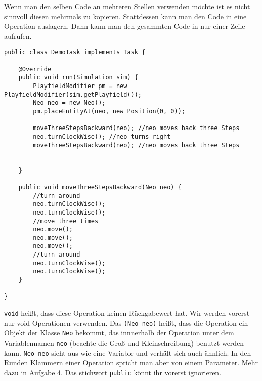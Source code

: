 \begin{Infobox}[Operation]
	Wenn man den selben Code an mehreren Stellen verwenden möchte ist es nicht sinnvoll diesen mehrmals zu kopieren. 
	Stattdessen kann man den Code in eine Operation auslagern. 
	Dann kann man den gesammten Code in nur einer Zeile aufrufen.

	\begin{lstlisting}
public class DemoTask implements Task {
    
    @Override
    public void run(Simulation sim) {
        PlayfieldModifier pm = new PlayfieldModifier(sim.getPlayfield());
        Neo neo = new Neo();
        pm.placeEntityAt(neo, new Position(0, 0));
     
        moveThreeStepsBackward(neo); //neo moves back three Steps
        neo.turnClockWise(); //neo turns right
        moveThreeStepsBackward(neo); //neo moves back three Steps
	
        
    }
    
    public void moveThreeStepsBackward(Neo neo) {
        //turn around
        neo.turnClockWise();
        neo.turnClockWise();
        //move three times
        neo.move();
        neo.move();
        neo.move();
        //turn around
        neo.turnClockWise();
        neo.turnClockWise();
    }
    
}
	\end{lstlisting}

	\lstinline{void} heißt, dass diese Operation keinen Rückgabewert hat. 
	Wir werden vorerst nur void Operationen verwenden. 
	Das \lstinline{(Neo neo)} heißt, dass die Operation ein Objekt der Klasse \lstinline{Neo} bekommt, das innnerhalb der Operation unter dem Variablennamen \lstinline{neo} (beachte die Groß und Kleinschreibung) benutzt werden kann.
	\lstinline{Neo neo} sieht aus wie eine Variable und verhält sich auch ähnlich.
	In den Runden Klammern einer Operation spricht man aber von einem Parameter.
	Mehr dazu in Aufgabe 4. 
	Das stichwort \lstinline{public} könnt ihr vorerst ignorieren.
\end{Infobox}


